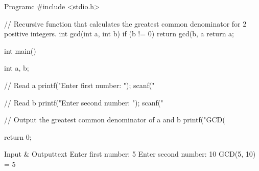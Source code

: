 \documentclass[11pt]{ipu-c}
\begin{document}
    \newpage
    \begin{code}
        {Program}{c}
#include <stdio.h>

// Recursive function that calculates the greatest common denominator for 2 positive integers.
int gcd(int a, int b) {
    if (b != 0) {
        return gcd(b, a %
    }
    return a;
}

int main() {
    int a, b;

    // Read a
    printf("Enter first number: ");
    scanf("%

    // Read b
    printf("Enter second number: ");
    scanf("%

    // Output the greatest common denominator of a and b
    printf("GCD(%

    return 0;
}
    \end{code}
    \begin{code}
        {Input \& Output}{text}
Enter first number: 5
Enter second number: 10
GCD(5, 10) = 5
    \end{code}

\end{document}
